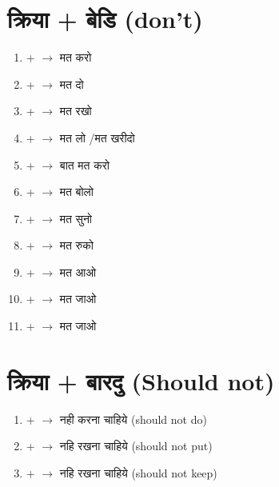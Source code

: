 \documentclass{article}
\begin{document}
\section{\s क्रिया + बेडि (don't)} 
\begin{multicols}{2}

\begin{enumerate}
    \item {\s {} +  $\longrightarrow$ \s मत करो } 
    \item {\s {} +  $\longrightarrow$ मत दो  } 
    \item {\s {} +  $\longrightarrow$ मत रखो  } 
    \item {\s {} +  $\longrightarrow$ मत लो /मत खरीदो }
    \item {\s {} +  $\longrightarrow$ बात  मत करो }
    \item {\s {} +  $\longrightarrow$ मत बोलो }
    \item {\s {} +  $\longrightarrow$ मत सुनो }
    \item {\s {} +  $\longrightarrow$ मत रुको }
    \item {\s {} +  $\longrightarrow$ मत आओ }
    \item {\s {} +  $\longrightarrow$ मत जाओ }
    \item {\s {} +  $\longrightarrow$ मत जाओ }
    
\end{enumerate}
\end{multicols}

\section{\s क्रिया + बारदु (Should not)}


\begin{enumerate}
    \item {\s {} +  $\longrightarrow$ \s नही करना चाहिये  (should not do)}
    \item {\s {} +  $\longrightarrow$ नहि रखना चाहिये (should not put)  } 
    \item {\s {} +  $\longrightarrow$ नहि रखना चाहिये (should not keep) } 
\end{enumerate}
\end{document}
